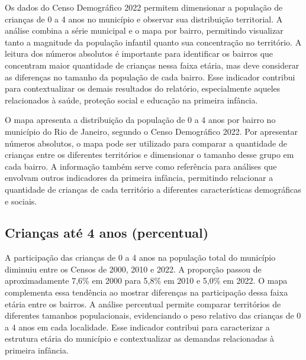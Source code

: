 Os dados do Censo Demográfico 2022 permitem dimensionar a população de crianças de 0 a 4 anos no município e observar sua distribuição territorial. A análise combina a série municipal e o mapa por bairro, permitindo visualizar tanto a magnitude da população infantil quanto sua concentração no território. A leitura dos números absolutos é importante para identificar os bairros que concentram maior quantidade de crianças nessa faixa etária, mas deve considerar as diferenças no tamanho da população de cada bairro. Esse indicador contribui para contextualizar os demais resultados do relatório, especialmente aqueles relacionados à saúde, proteção social e educação na primeira infância.


O mapa apresenta a distribuição da população de 0 a 4 anos por bairro no município do Rio de Janeiro, segundo o Censo Demográfico 2022. Por apresentar números absolutos, o mapa pode ser utilizado para comparar a quantidade de crianças entre os diferentes territórios e dimensionar o tamanho desse grupo em cada bairro. A informação também serve como referência para análises que envolvam outros indicadores da primeira infância, permitindo relacionar a quantidade de crianças de cada território a diferentes características demográficas e sociais.


\subsection{Crianças até 4 anos (percentual)}


A participação das crianças de 0 a 4 anos na população total do município diminuiu entre os Censos de 2000, 2010 e 2022. A proporção passou de aproximadamente 7,6\% em 2000 para 5,8\% em 2010 e 5,0\% em 2022. O mapa complementa essa tendência ao mostrar diferenças na participação dessa faixa etária entre os bairros. A análise percentual permite comparar territórios de diferentes tamanhos populacionais, evidenciando o peso relativo das crianças de 0 a 4 anos em cada localidade. Esse indicador contribui para caracterizar a estrutura etária do município e contextualizar as demandas relacionadas à primeira infância.

